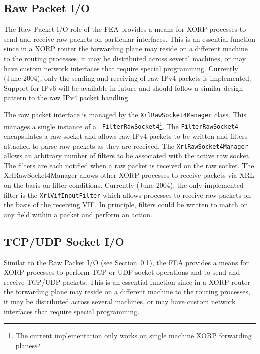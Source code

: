 \documentclass[11pt]{article}
\begin{document}
\subsection{Raw Packet I/O}
\label{sec:design:raw_packet_io}

The Raw Packet I/O role of the FEA provides a means for
XORP processes to send and receive raw packets on particular interfaces.
This is an essential function since in a XORP router the forwarding
plane may reside on a different machine to the routing processes, it
may be distributed across several machines, or may have custom network
interfaces that require special programming.  Currently (June 2004),
only the sending and receiving of raw IPv4 packets is implemented.
Support for IPv6 will be available in future and should follow a
similar design pattern to the raw IPv4 packet handling.

The raw packet interface is managed by the {\tt XrlRawSocket4Manager}
class.  This manages a single instance of a {\tt
FilterRawSocket4}\footnote{The current implementation only works on
single machine XORP forwarding planes}.  The {\tt FilterRawSocket4}
encapsulates a raw socket and allows raw IPv4 packets to be written
and filters attached to parse raw packets as they are received.  The
{\tt XrlRawSocket4Manager} allows an arbitrary number of filters to be
associated with the active raw socket.  The filters are each notified
when a raw packet is received on the raw socket.  The
XrlRawSocket4Manager allows other XORP processes to receive packets
via XRL on the basis on filter conditions.  Currently (June 2004),
the only implemented filter is the {\tt XrlVifInputFilter} which
allows processes to receive raw packets on the basis of the receiving
VIF.  In principle, filters could be written to match on any field
within a packet and perform an action.

\subsection{TCP/UDP Socket I/O}

Similar to the Raw Packet I/O (see
Section~\ref{sec:design:raw_packet_io}), the FEA provides a means for
XORP processes to perform TCP or UDP socket operations and to send and
receive TCP/UDP packets.
This is an essential function since in a XORP router the forwarding
plane may reside on a different machine to the routing processes, it
may be distributed across several machines, or may have custom network
interfaces that require special programming.
\end{document}
